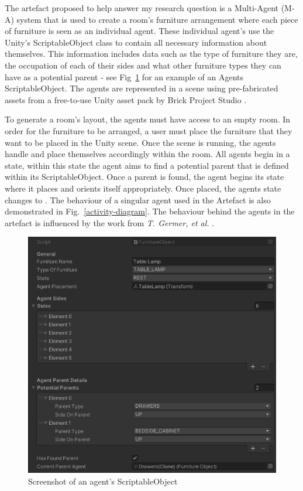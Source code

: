 The artefact proposed to help answer my research question is a Multi-Agent (M-A) system that is used to create a room's furniture arrangement where each piece of furniture is seen as an individual agent. These individual agent's use the Unity's \cite{unity} ScriptableObject class to contain all necessary information about themselves. This information includes data such as the type of furniture they are, the occupation of each of their sides and what other furniture types they can have as a potential parent - see Fig~\ref{agent-so} for an example of an Agents ScriptableObject. The agents are represented in a scene using pre-fabricated assets from a free-to-use Unity asset pack by Brick Project Studio \cite{brick-project}.

To generate a room's layout, the agents must have access to an empty room. In order for the furniture to be arranged, a user must place the furniture that they want to be placed in the Unity scene. Once the scene is running, the agents handle and place themselves accordingly within the room.
All agents begin in a  state, within this state the agent aims to find a potential parent that is defined within its ScriptableObject. Once a parent is found, the agent begins its  state where it places and orients itself appropriately. Once placed, the agents state changes to . The behaviour of a singular agent used in the Artefact is also demonstrated in Fig.~\ref{activity-diagram}.
The behaviour behind the agents in the artefact is influenced by the work from \textit{T. Germer, et al.} \cite{real-time-walkthroughs}.

\begin{figure}[!ht]
    \includegraphics[width=\columnwidth]{./Images/agent-SO.png}
    \centering
    \caption{Screenshot of an agent's ScriptableObject}
    \label{agent-so}
\end{figure}

